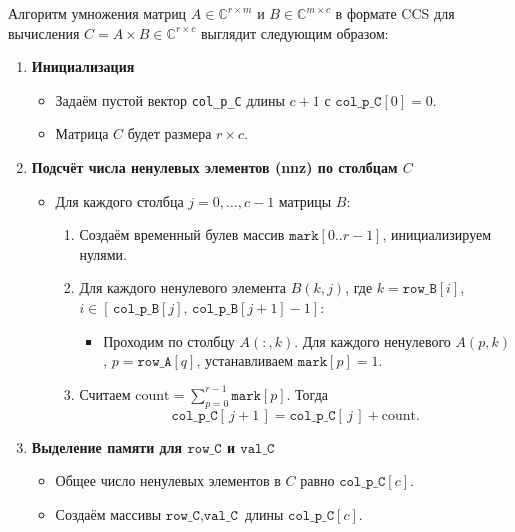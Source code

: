 \documentclass[12pt]{article}
\begin{document}
Алгоритм умножения матриц \(A\in\mathbb{C}^{r\times m}\) и \(B\in\mathbb{C}^{m\times c}\) в формате CCS для вычисления \(C = A \times B \in \mathbb{C}^{r\times c}\) выглядит следующим образом:

\begin{enumerate}
    \item \textbf{Инициализация}
    \begin{itemize}
        \item Задаём пустой вектор \texttt{col\_p\_C} длины \(c+1\) с \(\texttt{col\_p\_C}[0] = 0\).
        \item Матрица \(C\) будет размера \(r \times c\).
    \end{itemize}

    \item \textbf{Подсчёт числа ненулевых элементов (nnz) по столбцам \(C\)}
    \begin{itemize}
        \item Для каждого столбца \(j = 0, \dots, c-1\) матрицы \(B\):
        \begin{enumerate}
            \item Создаём временный булев массив \(\texttt{mark}[0..r-1]\), инициализируем нулями.
            \item Для каждого ненулевого элемента \(B(k,j)\), где \(k = \texttt{row\_B}[i]\), \(i \in [\,\texttt{col\_p\_B}[j],\,\texttt{col\_p\_B}[j+1]-1]\):
            \begin{itemize}
                \item Проходим по столбцу \(A(:,k)\). Для каждого ненулевого \(A(p,k)\), \(p = \texttt{row\_A}[q]\), устанавливаем \(\texttt{mark}[p] = 1\).
            \end{itemize}
            \item Считаем \(\displaystyle \text{count} = \sum_{p=0}^{r-1} \texttt{mark}[p]\). Тогда
            \[
                \texttt{col\_p\_C}[\,j+1\,] = \texttt{col\_p\_C}[\,j\,] + \text{count}.
            \]
        \end{enumerate}
    \end{itemize}

    \item \textbf{Выделение памяти для \(\texttt{row\_C}\) и \(\texttt{val\_C}\)}
    \begin{itemize}
        \item Общее число ненулевых элементов в \(C\) равно \(\texttt{col\_p\_C}[c]\).
        \item Создаём массивы \(\texttt{row\_C}, \texttt{val\_C}\) длины \(\texttt{col\_p\_C}[c]\).
    \end{itemize}


\end{enumerate}
\end{document}
